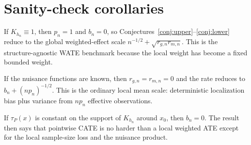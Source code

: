 \documentclass[11pt]{article}
\theoremstyle{definition}
\theoremstyle{plain}
\theoremstyle{remark}
\begin{document}
\section{Sanity-check corollaries}
If $K_{h_n}\equiv1$, then $p_n=1$ and $b_n=0$, so Conjectures~\ref{conj:upper}--\ref{conj:lower} reduce to the global weighted-effect scale $n^{-1/2}+\sqrt{r_{g,n}r_{m,n}}$. This is the structure-agnostic WATE benchmark because the local weight has become a fixed bounded weight.

If the nuisance functions are known, then $r_{g,n}=r_{m,n}=0$ and the rate reduces to $b_n+(n p_n)^{-1/2}$. This is the ordinary local mean scale: deterministic localization bias plus variance from $n p_n$ effective observations.

If $\tau_P(x)$ is constant on the support of $K_{h_n}$ around $x_0$, then $b_n=0$. The result then says that pointwise CATE is no harder than a local weighted ATE except for the local sample-size loss and the nuisance product.
\end{document}
